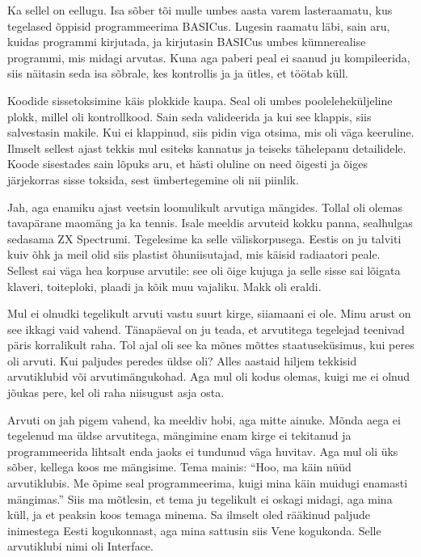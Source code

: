 
Ka sellel on eellugu. Isa sõber tõi mulle umbes aasta varem lasteraamatu, kus tegelased õppisid programmeerima 
BASICus. Lugesin raamatu läbi, sain aru, kuidas 
programmi kirjutada, ja kirjutasin BASICus umbes kümnerealise programmi, mis 
midagi arvutas. Kuna aga paberi peal ei saanud ju
kompileerida, siis näitasin seda isa sõbrale, kes kontrollis ja  
ja ütles, et töötab küll.

Koodide sissetoksimine käis plokkide kaupa. Seal oli 
umbes poole{\-}leheküljeline plokk, millel oli kontrollkood. Sain seda 
valideerida ja kui see klappis, siis salvestasin makile. 
Kui ei klappinud, siis pidin viga otsima, mis oli väga 
keeruline. Ilmselt sellest ajast tekkis mul esiteks 
kannatus ja teiseks tähelepanu detailidele. Koode sisestades sain
lõpuks aru, et hästi oluline on need õigesti ja õiges 
järjekorras sisse toksida, sest ümbertegemine oli nii piinlik.



Jah, aga enamiku ajast veetsin loomulikult arvutiga mängides. Tollal 
oli olemas tavapärane maomäng ja ka tennis. Isale meeldis arvuteid kokku panna, sealhulgas sedasama 
ZX Spectrumi. Tegelesime ka 
selle väliskorpusega. Eestis on ju talviti kuiv õhk ja 
meil olid siis plastist õhuniisutajad, mis käisid radiaatori peale. Sellest sai väga 
hea korpuse arvutile: see oli õige kujuga ja selle sisse sai lõigata 
klaveri, toiteploki, plaadi ja kõik muu vajaliku. Makk oli eraldi.


Mul ei olnudki tegelikult arvuti vastu suurt kirge, siiamaani ei ole. Minu arust on see ikkagi vaid vahend. Tänapäeval on ju
teada, et arvutitega tegelejad teenivad päris korralikult raha. Tol ajal oli see ka mõnes mõttes staatuseküsimus, kui peres oli
arvuti. Kui paljudes peredes
üldse oli? Alles aastaid hiljem tekkisid arvutiklubid või
arvutimängukohad. Aga mul oli kodus olemas, kuigi me ei olnud
jõukas pere, kel oli raha niisugust asja osta. 

Arvuti on jah pigem vahend, ka meeldiv hobi, aga mitte ainuke. Mõnda aega ei tegelenud ma üldse arvutitega, 
mängimine enam kirge ei tekitanud ja programmeerida lihtsalt enda jaoks ei
tundunud väga huvitav. Aga mul oli üks sõber, kellega koos me mängisime. Tema
mainis: \enquote{Hoo, ma käin nüüd arvutiklubis. Me õpime seal programmeerima,
kuigi mina käin muidugi enamasti mängimas.} Siis ma mõtlesin, et tema ju
tegelikult ei oskagi midagi, aga mina küll, ja et peaksin koos temaga minema. Sa
ilmselt oled rääkinud paljude inimestega Eesti kogukonnast, aga mina sattusin
siis Vene kogukonda. Selle arvutiklubi nimi oli Interface.


